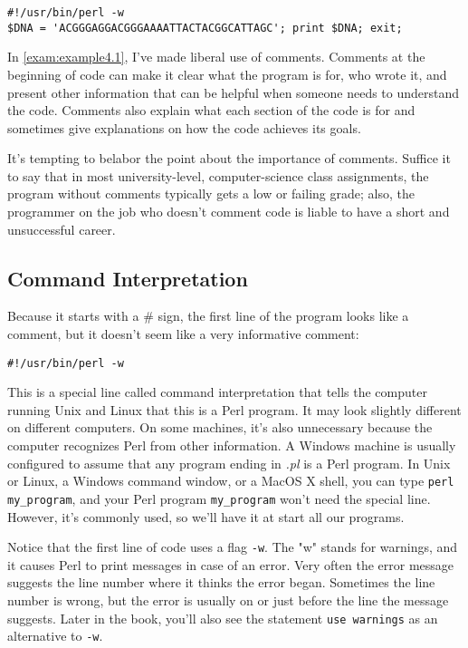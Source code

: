 \begin{lstlisting}
#!/usr/bin/perl -w
$DNA = 'ACGGGAGGACGGGAAAATTACTACGGCATTAGC'; print $DNA; exit;
\end{lstlisting}

In \autoref{exam:example4.1}, I've made liberal use of comments. Comments at the beginning of code can make it clear what the program is for, who wrote it, and present other information that can be helpful when someone needs to understand the code. Comments also explain what each section of the code is for and sometimes give explanations on how the code achieves its goals.

It's tempting to belabor the point about the importance of comments. Suffice it to say that in most university-level, computer-science class assignments, the program without comments typically gets a low or failing grade; also, the programmer on the job who doesn't comment code is liable to have a short and unsuccessful career.

\subsection{Command Interpretation}
\label{sec:section4.2.3}
Because it starts with a \# sign, the first line of the program looks like a comment, but it doesn't seem like a very informative comment:

\begin{lstlisting}
#!/usr/bin/perl -w
\end{lstlisting}

This is a special line called command interpretation that tells the computer running Unix and Linux that this is a Perl program. It may look slightly different on different computers. On some machines, it's also unnecessary because the computer recognizes Perl from other information. A Windows machine is usually configured to assume that any program ending in \textit{.pl} is a Perl program. In Unix or Linux, a Windows command window, or a MacOS X shell, you can type \verb|perl my_program|, and your Perl program \verb|my_program| won't need the special line. However, it's commonly used, so we'll have it at start all our programs.

Notice that the first line of code uses a flag \verb|-w|. The "w" stands for warnings, and it causes Perl to print messages in case of an error. Very often the error message suggests the line number where it thinks the error began. Sometimes the line number is wrong, but the error is usually on or just before the line the message suggests. Later in the book, you'll also see the statement \verb|use warnings| as an alternative to \verb|-w|. 

